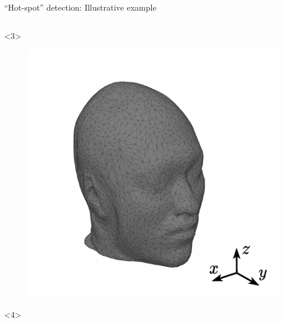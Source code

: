 \documentclass[xcolor=dvipsnames,10pt]{beamer}
\begin{document}
\begin{frame}{``Hot-spot'' detection: Illustrative example}
\begin{columns}[c]
\begin{column}{0.4\textwidth}
\begin{onlyenv}
\begin{center}
\begin{figure}
                \end{figure}
                \end{center}
            \end{onlyenv}
            \begin{onlyenv}<3>
                \begin{center}
                \begin{figure}
                    \includegraphics[width=\textwidth]{artwork/head.surf.pdf}
                \end{figure}
                \end{center}
            \end{onlyenv}
            \begin{onlyenv}<4>
                \begin{center}
                \begin{figure}

\end{figure}
\end{center}
\end{onlyenv}
\end{column}
\end{columns}
\end{frame}
\end{document}
